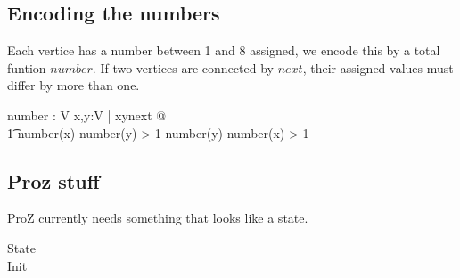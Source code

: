 \documentclass{article}
\begin{document}
\subsection*{Encoding the numbers}
Each vertice has a number between 1 and 8 assigned, we encode this by a total funtion $number$.
If two vertices are connected by $next$, their assigned values must differ by
more than one.
\begin{axdef}
  number : V 
  \where
  \forall x,y:V | x\mapsto y\in next @ \\ 
  \t1 number(x)-number(y) > 1 \lor number(y)-number(x) > 1
\end{axdef}

\subsection*{Proz stuff}
ProZ currently needs something that looks like a state.
\begin{zed}
  State \\
  Init 
\end{zed}
\end{document}
